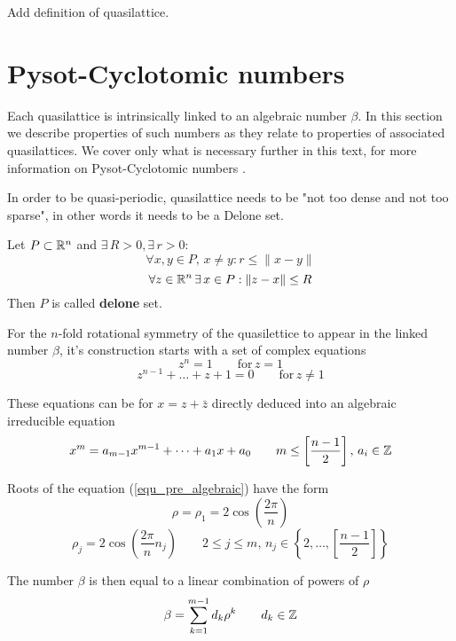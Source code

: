 \documentclass[text.tex]{subfiles}
\begin{document}
Add definition of quasilattice. 

\section{Pysot-Cyclotomic numbers}
Each quasilattice is intrinsically linked to an algebraic number $\beta$. In this section we describe properties of such numbers as they relate to properties of associated quasilattices. We cover only what is necessary further in this text,  for more information on Pysot-Cyclotomic numbers \cite{}. 

In order to be quasi-periodic, quasilattice needs to be "not too dense and not too sparse", in other words it needs to be a Delone set. 

\begin{definition} 
Let $P\subset \mathbb{R}^n$ and $\exists\, R>0, \exists\, r>0$:
$$\forall x,y\in P,\, x\neq y: r\leq \|x-y\|$$
$$\forall z\in\mathbb{R}^n\, \exists\, x\in P: \|z-x\|\leq R$$
Then $P$ is called \textbf{delone} set.\\
\end{definition}

For the $n$-fold rotational symmetry of the quasilettice to appear in the linked number $\beta$, it's construction starts with a set of complex equations
$$z^n=1\qquad \text{for}\, z=1$$
$$z^{n-1}+\dots+z+1 = 0\qquad \text{for}\, z\neq 1$$

These equations can be for $x=z+\bar{z}$ directly deduced into an algebraic irreducible equation
\begin{equation}\label{equ_pre_algebraic} 
x^m = a_{m-1}x^{m-1}+\dots+a_1x+a_0\qquad m\leq\left[\frac{n-1}{2}\right],\, a_i\in\mathbb{Z}
\end{equation} 

Roots of the equation (\ref{equ_pre_algebraic}) have the form 
$$\rho = \rho_1 = 2\cos\left(\frac{2\pi}{n}\right)$$
$$\rho_j = 2\cos\left(\frac{2\pi}{n}n_j\right) \qquad 2\leq j\leq m, \, n_j\in\left\{2,\dots,\left[\frac{n-1}{2}\right]\right\}$$

The number $\beta$ is then equal to a linear combination of powers of $\rho$
$$\beta = \sum_{k=1}^{m-1}{d_k\rho^k}\qquad d_k\in\mathbb{Z}$$
\end{document}

